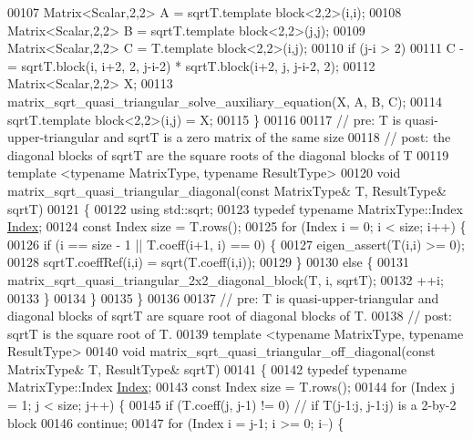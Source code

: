 \begin{DoxyCode}
00107   Matrix<Scalar,2,2> A = sqrtT.template block<2,2>(i,i);
00108   Matrix<Scalar,2,2> B = sqrtT.template block<2,2>(j,j);
00109   Matrix<Scalar,2,2> C = T.template block<2,2>(i,j);
00110   \textcolor{keywordflow}{if} (j-i > 2)
00111     C -= sqrtT.block(i, i+2, 2, j-i-2) * sqrtT.block(i+2, j, j-i-2, 2);
00112   Matrix<Scalar,2,2> X;
00113   matrix\_sqrt\_quasi\_triangular\_solve\_auxiliary\_equation(X, A, B, C);
00114   sqrtT.template block<2,2>(i,j) = X;
00115 \}
00116 
00117 \textcolor{comment}{// pre:  T is quasi-upper-triangular and sqrtT is a zero matrix of the same size}
00118 \textcolor{comment}{// post: the diagonal blocks of sqrtT are the square roots of the diagonal blocks of T}
00119 \textcolor{keyword}{template} <\textcolor{keyword}{typename} MatrixType, \textcolor{keyword}{typename} ResultType>
00120 \textcolor{keywordtype}{void} matrix\_sqrt\_quasi\_triangular\_diagonal(\textcolor{keyword}{const} MatrixType& T, ResultType& sqrtT)
00121 \{
00122   \textcolor{keyword}{using} std::sqrt;
00123   \textcolor{keyword}{typedef} \textcolor{keyword}{typename} MatrixType::Index \hyperlink{namespace_eigen_a62e77e0933482dafde8fe197d9a2cfde}{Index};
00124   \textcolor{keyword}{const} Index size = T.rows();
00125   \textcolor{keywordflow}{for} (Index i = 0; i < size; i++) \{
00126     \textcolor{keywordflow}{if} (i == size - 1 || T.coeff(i+1, i) == 0) \{
00127       eigen\_assert(T(i,i) >= 0);
00128       sqrtT.coeffRef(i,i) = sqrt(T.coeff(i,i));
00129     \}
00130     \textcolor{keywordflow}{else} \{
00131       matrix\_sqrt\_quasi\_triangular\_2x2\_diagonal\_block(T, i, sqrtT);
00132       ++i;
00133     \}
00134   \}
00135 \}
00136 
00137 \textcolor{comment}{// pre:  T is quasi-upper-triangular and diagonal blocks of sqrtT are square root of diagonal blocks of T.}
00138 \textcolor{comment}{// post: sqrtT is the square root of T.}
00139 \textcolor{keyword}{template} <\textcolor{keyword}{typename} MatrixType, \textcolor{keyword}{typename} ResultType>
00140 \textcolor{keywordtype}{void} matrix\_sqrt\_quasi\_triangular\_off\_diagonal(\textcolor{keyword}{const} MatrixType& T, ResultType& sqrtT)
00141 \{
00142   \textcolor{keyword}{typedef} \textcolor{keyword}{typename} MatrixType::Index \hyperlink{namespace_eigen_a62e77e0933482dafde8fe197d9a2cfde}{Index};
00143   \textcolor{keyword}{const} Index size = T.rows();
00144   \textcolor{keywordflow}{for} (Index j = 1; j < size; j++) \{
00145       \textcolor{keywordflow}{if} (T.coeff(j, j-1) != 0)  \textcolor{comment}{// if T(j-1:j, j-1:j) is a 2-by-2 block}
00146     \textcolor{keywordflow}{continue};
00147     \textcolor{keywordflow}{for} (Index i = j-1; i >= 0; i--) \{

\end{DoxyCode}
